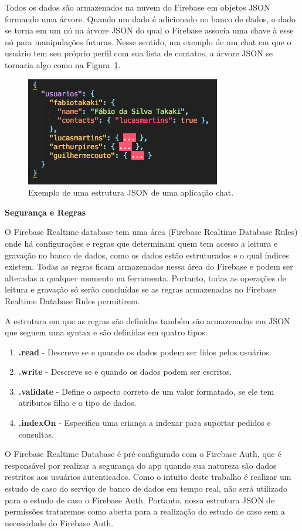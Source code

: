 \documentclass[12pt]{article}
\begin{document}
Todos os dados são armazenados na nuvem do Firebase em objetos JSON formando uma árvore. Quando um dado é adicionado no banco de dados, o dado se torna em um nó na árvore JSON do qual o Firebase associa uma chave à esse nó para manipulações futuras. Nesse sentido, um exemplo de um chat em que o usuário tem seu próprio perfil com sua lista de contatos, a árvore JSON se tornaria algo como na Figura~\ref{fig:json-tree}.

\begin{figure}[ht]
\centering
\includegraphics[width=.5\textwidth]{json-tree.png}
\caption{Exemplo de uma estrutura JSON de uma aplicação chat.}
\label{fig:json-tree}
\end{figure}


\textbf{Segurança e Regras}

O Firebase Realtime database tem uma área (Firebase Realtime Database Rules) onde há configurações e regras que determinam quem tem acesso a leitura e gravação no banco de dados, como os dados estão estruturados e o qual índices existem. Todas as regras ficam armazenadas nessa área do Firebase e podem ser alteradas a qualquer momento na ferramenta. Portanto, todas as operações de leitura e gravação só serão concluídas se as regras armazenadas no Firebase Realtime Database Rules permitirem. 

A estrutura em que as regras são definidas também são armazenadas em JSON que seguem uma syntax e são definidas em quatro tipos: 
\begin{enumerate}
  \item \textbf{.read} - Descreve se e quando os dados podem ser lidos pelos usuários.
  \item \textbf{.write} - Descreve se e quando os dados podem ser escritos.
  \item \textbf{.validate} - Define o aspecto correto de um valor formatado, se ele tem atributos filho e o tipo de dados.
  \item \textbf{.indexOn} - Especifica uma criança a indexar para suportar pedidos e consultas.
\end{enumerate}

O Firebase Realtime Database é pré-configurado com o Firebase Auth, que é responsável por realizar a segurança do app quando sua natureza são dados restritos aos usuários autenticados. Como o intuito deste trabalho é realizar um estudo de caso do serviço de banco de dados em tempo real, não será utilizado para o estudo de caso o Firebase Auth. Portanto, nossa estrutura JSON de permissões trataremos como aberta para a realização do estudo de caso sem a necessidade do Firebase Auth.
\end{document}
